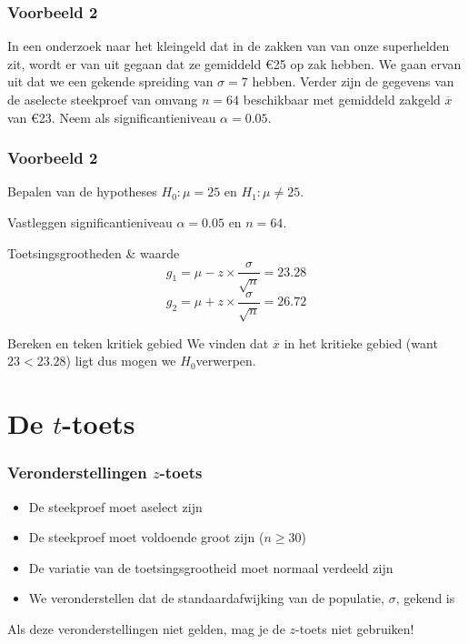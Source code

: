 \documentclass{beamer}
\begin{document}
\begin{frame}
  \frametitle{Voorbeeld 2}
  In een onderzoek naar het kleingeld dat in de zakken van  van  onze superhelden zit, wordt er van uit gegaan dat ze gemiddeld \euro{25} op zak hebben. We gaan ervan uit dat we een gekende spreiding van $\sigma = 7$ hebben. Verder zijn de gegevens van de aselecte steekproef van omvang $n=64$ beschikbaar met gemiddeld zakgeld $\overline{x}$ van \euro{23}. Neem als significantieniveau $\alpha = 0.05$.
\end{frame}

\begin{frame}
  \frametitle{Voorbeeld 2}
  \begin{block}{Bepalen van de hypotheses}
  $H_{0} : \mu = 25$ en $H_{1}: \mu \neq 25$.
  \end{block}

  \begin{block}{Vastleggen significantieniveau}
  $\alpha = 0.05$ en $n=64$.
  \end{block}

  \begin{block}{Toetsingsgrootheden \& waarde}
    \[ g_{1} = \mu - z \times \frac{\sigma}{\sqrt{n}} = 23.28 \]
    \[ g_{2} = \mu + z \times \frac{\sigma}{\sqrt{n}} = 26.72 \]
    \end{block}

    \begin{block}{Bereken en teken kritiek gebied}
      We vinden dat $\overline{x}$ in het kritieke gebied (want $23 < 23.28$) ligt dus mogen we $H_{0}$verwerpen.
  \end{block}
\end{frame}

\section{De $t$-toets}
\sectionframelogo{}

\begin{frame}
  \frametitle{Veronderstellingen $z$-toets}
  
  
  \begin{itemize}
    \item De steekproef moet aselect zijn
    \item De steekproef moet voldoende groot zijn ($n \ge 30$)
    \item De variatie van de toetsingsgrootheid moet normaal verdeeld zijn
    \item We veronderstellen dat de standaardafwijking van de populatie, $\sigma$, gekend is
  \end{itemize}

  Als deze veronderstellingen niet gelden, mag je de $z$-toets niet gebruiken!
\end{frame}
\end{document}
